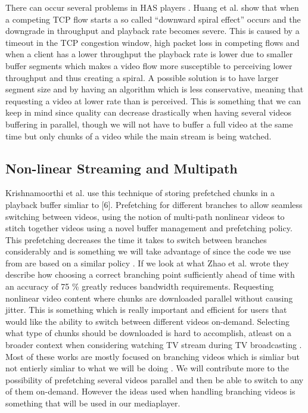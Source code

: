 \documentclass[9pt,a4paper]{acmproc}
\begin{document}
There can occur several problems in HAS players \cite{qualbranch}. Huang et al. \cite{streamrate} show that when a competing TCP flow starts a so called “downward spiral effect” occurs and the downgrade in throughput and playback rate becomes severe. This is caused by a timeout in the TCP congestion window, high packet loss in competing flows and when a client has a lower throughput the playback rate is lower due to smaller buffer segments which makes a video flow more susceptible to perceiving lower throughput and thus creating a spiral. A possible solution is to have larger segment size and by having an algorithm which is less conservative, meaning that requesting a video at lower rate than is perceived. This is something that we can keep in mind since quality can decrease drastically when having several videos buffering in parallel, though we will not have to buffer a full video at the same time but only chunks of a video while the main stream is being watched.

\subsection{Non-linear Streaming and Multipath}
Krishnamoorthi et al. \cite{hasmultipath} use this technique of storing prefetched chunks in a playback buffer simliar to [6]. Prefetching for different branches to allow seamless switching between videos, using the notion of multi-path nonlinear videos to stitch together videos using a novel buffer management and prefetching policy. This prefetching decreases the time it takes to switch between branches considerably and is something we will take advantage of since the code we use from \cite{qualbranch} are based on a similar policy \cite{hasmultipath}. If we look at what Zhao et al. \cite{scalableOnDemand} wrote they describe how choosing a correct branching point sufficiently ahead of time with an accuracy of 75 \% greatly reduces bandwidth requirements. Requesting nonlinear video content where chunks are downloaded parallel without causing jitter. This is something which is really important and efficient for users that would like the ability to switch between different videos on-demand. Selecting what type of chunks should be downloaded is hard to accomplish, atleast on a broader context when considering watching TV stream during TV broadcasting \cite{scalableOnDemand}.  Most of these works are mostly focused on branching videos which is simliar but not entierly simliar to what we will be doing \cite{qualbranch, hasmultipath,scalableOnDemand}. We will contribute more to the possibility of prefetching several videos parallel and then be able to switch to any of  them on-demand. However the ideas used when handling branching videos is something that will be used in our mediaplayer.
\end{document}
